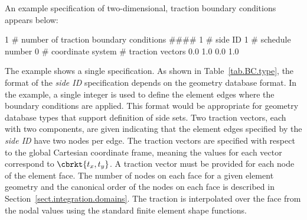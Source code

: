 An example specification of two-dimensional, traction boundary conditions appears below:
\begin{inputfile}
1	# number of traction boundary conditions
####
1  # side ID
1  # schedule number
0  # coordinate system 
# traction vectors
0.0  1.0   
0.0  1.0
\end{inputfile}
The example shows a single specification. As shown in Table~\ref{tab.BC.type}, the format of the \textit{side ID} specification depends on the geometry database format. In the example, a single integer is used to define the element edges where the boundary conditions are applied. This format would be appropriate for geometry database types that support definition of side sets. Two traction vectors, each with two components, are given indicating that the element edges specified by the \textit{side ID} have two nodes per edge. The traction vectors are specified with respect to the global Cartesian coordinate frame, meaning the values for each vector correspond to $\cbrkt{t_x, t_y}$. A traction vector must be provided for each node of the element face. The number of nodes on each face for a given element geometry and the canonical order of the nodes on each face is described in Section~\ref{sect.integration.domains}. The traction is interpolated over the face from the nodal values using the standard finite element shape functions.

